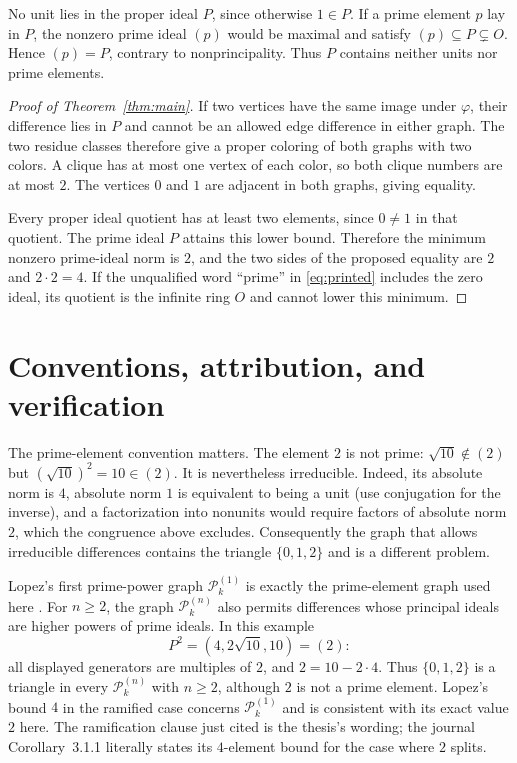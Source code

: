 \documentclass[11pt,letterpaper]{article}
\begin{document}
No unit lies in the proper ideal $P$, since otherwise $1\in P$.
If a prime element $p$ lay in $P$, the nonzero prime ideal $(p)$ would be
maximal and satisfy $(p)\subseteq P\subsetneq O$. Hence $(p)=P$, contrary
to nonprincipality. Thus $P$ contains neither units nor prime elements.

\begin{proof}[Proof of Theorem~\ref{thm:main}]
If two vertices have the same image under $\varphi$, their difference
lies in $P$ and cannot be an allowed edge difference in either graph.
The two residue classes therefore give a proper coloring of both graphs
with two colors. A clique has at most one vertex of each color, so both
clique numbers are at most $2$. The vertices $0$ and $1$ are adjacent in
both graphs, giving equality.

Every proper ideal quotient has at least two elements, since $0\ne1$ in
that quotient. The prime ideal $P$ attains this lower bound. Therefore
the minimum nonzero prime-ideal norm is $2$, and the two sides of the
proposed equality are $2$ and $2\cdot2=4$. If the unqualified word
``prime'' in \eqref{eq:printed} includes the zero ideal, its quotient is
the infinite ring $O$ and cannot lower this minimum.
\end{proof}

\section{Conventions, attribution, and verification}

The prime-element convention matters. The element $2$ is not prime:
$\sqrt{10}\notin(2)$ but $(\sqrt{10})^2=10\in(2)$. It is nevertheless
irreducible. Indeed, its absolute norm is $4$, absolute norm $1$ is
equivalent to being a unit (use conjugation for the inverse), and a
factorization into nonunits would require factors of absolute norm $2$,
which the congruence above excludes. Consequently the graph that allows
irreducible differences contains the triangle $\{0,1,2\}$ and is a
different problem.

Lopez's first prime-power graph $\mathcal P_k^{(1)}$ is exactly the
prime-element graph used here \cite[Definition~52, p.~26]{lopez}.
For $n\ge2$, the graph $\mathcal P_k^{(n)}$ also permits differences
whose principal ideals are higher powers of prime ideals. In this
example
\[
 P^2=(4,2\sqrt{10},10)=(2):
\]
all displayed generators are multiples of $2$, and $2=10-2\cdot4$.
Thus $\{0,1,2\}$ is a triangle in every $\mathcal P_k^{(n)}$ with
$n\ge2$, although $2$ is not a prime element. Lopez's bound $4$ in the
ramified case \cite[Theorem~55, p.~27]{lopez} concerns
$\mathcal P_k^{(1)}$ and is consistent with its exact value $2$ here.
The ramification clause just cited is the thesis's wording; the journal
Corollary~3.1.1 \cite[p.~573]{long} literally states its $4$-element
bound for the case where $2$ splits.
\end{document}
